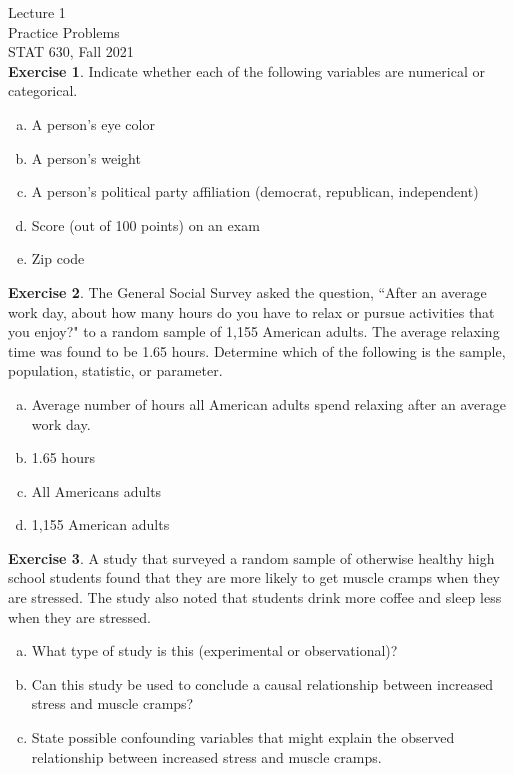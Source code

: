 \documentclass[11pt, fleqn]{article}\usepackage[]{graphicx}\usepackage[]{color}
\begin{document}
\setlength\parindent{0pt}
Lecture 1\\
Practice Problems\\
STAT 630, Fall 2021\\

\textbf{Exercise 1}.  Indicate whether each of the following variables are numerical or categorical.
\begin{enumerate}[(a)]
\item A person's eye color
\item A person's weight
\item A person's political party affiliation (democrat, republican, independent)
\item Score (out of 100 points) on an exam
\item Zip code\\
\end{enumerate} 

\textbf{Exercise 2}. The General Social Survey asked the question, ``After an average work day, about how many hours do you have to relax or pursue activities that you enjoy?" to a random sample of 1,155 American adults. The average relaxing time was found to be 1.65 hours. Determine which of the following is the sample, population, statistic, or parameter.
\begin{enumerate}[(a)]
\item Average number of hours all American adults spend relaxing after an average 
work day.
\item 1.65 hours
\item All Americans adults
\item 1,155 American adults\\
\end{enumerate}

\textbf{Exercise 3}. A study that surveyed a random sample of otherwise healthy high school students found that they are more likely to get muscle cramps when they are stressed. The study also noted that students drink more coffee and sleep less when they are stressed.
\begin{enumerate}[(a)]
\item What type of study is this (experimental or observational)?\\
\vspace{10pt}
\item Can this study be used to conclude a causal relationship between 
increased stress and muscle cramps?\\
\vspace{10pt}
\item State possible confounding variables that might explain the observed 
relationship between increased stress and muscle cramps.\\ 
\end{enumerate}
\end{document}
